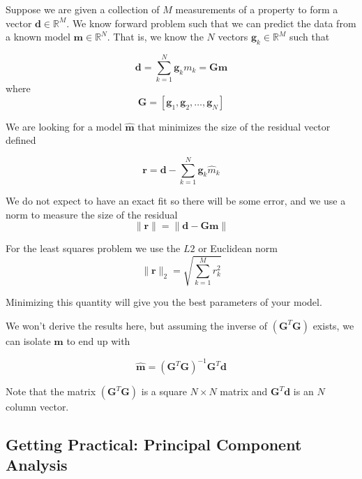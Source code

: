 \documentclass{article}
\newcommand{\real}{\mathbb{R}}
\begin{document}
Suppose we are given a collection of $M$ measurements of a property to
form a vector $\mathbf{d} \in \real^M$. We know forward problem such
that we can predict the data from a known model $\mathbf{m} \in
\real^N$. That is, we know the $N$ vectors $\mathbf{g}_k \in \real^M$
such that   

\begin{equation}
\mathbf{d} = \sum_{k=1}^{N} \mathbf{g}_k m_k = \mathbf{G} \mathbf{m}
\end{equation}
where
\begin{equation}
\mathbf{G} = \left[ \mathbf{g}_1, \mathbf{g}_2, \dots, \mathbf{g}_N \right] 
\end{equation}

We are looking for a model $\hat{\mathbf{m}}$ that minimizes the size of the residual vector defined

\begin{equation}
\mathbf{r} = \mathbf{d} -  \sum_{k=1}^{N} \mathbf{g}_k \hat{m}_k
\end{equation}

We do not expect to have an exact fit so there will be some error, and we use a norm to measure the size of the residual
\begin{equation}
\| \mathbf{r} \| = \| \mathbf{d} - \mathbf{Gm} \|
\end{equation}

For the least squares problem we use the $L2$ or Euclidean norm 
\begin{equation}
\| \mathbf{r} \|_2 = \sqrt{\sum_{k=1}^M r^2_k}
\end{equation}

Minimizing this quantity will give you the best parameters of your model.


We won't derive the results here, but assuming the inverse of $(\mathbf{G}^T \mathbf{G})$ exists, we can isolate $\hat{\mathbf{m}}$ to end up with

\begin{equation}
\hat{\mathbf{m}} = {(\mathbf{G}^T \mathbf{G})}^{-1}\mathbf{G}^T \mathbf{d}   
\end{equation}

Note that the matrix ${(\mathbf{G}^T \mathbf{G})}$ is a square $N\times N$ matrix and $\mathbf{G}^T\mathbf{d}$ is an $N$ column vector. 

\subsection{Getting Practical: Principal Component Analysis}
\end{document}
